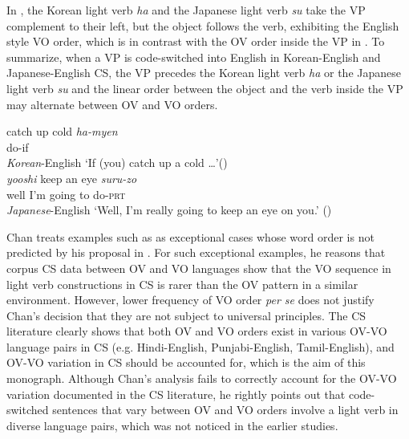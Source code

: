 In , the Korean light verb \textit{ha} and the Japanese light verb \textit{su} take the \ac{VP} complement to their left, but the object follows the verb, exhibiting the English style \ac{VO} order, which is in contrast with the \ac{OV} order inside the \ac{VP} in . To summarize, when a \ac{VP} is code-switched into English in Korean-English and Japanese-English \ac{CS}, the \ac{VP} precedes the Korean light verb \textit{ha} or the Japanese light verb \textit{su} and the linear order between the object and the verb inside the \ac{VP} may alternate between \ac{OV} and \ac{VO} orders.

\begin{exe} \ex \label{ex:10}
    \begin{xlist}
    \ex \gll catch up cold \textit{ha-myen}\footnotemark	\\
    {} {} {} do-if \\    \hfill \textit{Korean}-English
    \glt ‘If (you) catch up a cold \ldots’(\citealt{Park1990}) \\

    \ex \gll \textit{yooshi} keep an eye \textit{suru-zo} \\
    	{well I’m going to} {} {} {} do-\textsc{prt} \\\hfill \textit{Japanese}-English
    \glt ‘Well, I’m really going to keep an eye on you.’  (\citealt{NambaND})
    \end{xlist}
\end{exe}


Chan treats examples such as  as exceptional cases whose word order is not predicted by his proposal in . For such exceptional examples, he reasons that corpus \ac{CS} data between \ac{OV} and \ac{VO} languages show that the \ac{VO} sequence in light verb constructions in \ac{CS} is rarer than the \ac{OV} pattern in a similar environment. However, lower frequency of \ac{VO} order \textit{per se} does not justify Chan’s decision that they are not subject to universal principles. The \ac{CS} literature clearly shows that both \ac{OV} and \ac{VO} orders exist in various \ac{OV}-\ac{VO} language pairs in \ac{CS} (e.g. Hindi-English, Punjabi-English, Tamil-English), and \ac{OV}-\ac{VO} variation in \ac{CS} should be accounted for, which is the aim of this monograph. Although Chan’s analysis fails to correctly account for the \ac{OV}-\ac{VO} variation documented in the \ac{CS} literature, he rightly points out that code-switched sentences that vary between \ac{OV} and \ac{VO} orders involve a light verb in diverse language pairs, which was not noticed in the earlier studies. 


